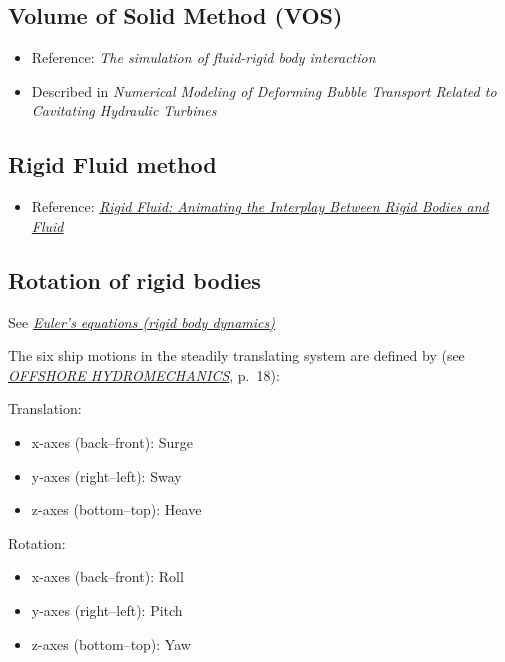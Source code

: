 \subsection{Volume of Solid Method (VOS)}

\begin{itemize}
    \item Reference: \textit{The simulation of fluid-rigid body interaction}
    \item Described in \textit{Numerical Modeling of Deforming Bubble Transport Related to Cavitating Hydraulic Turbines}
\end{itemize}

\subsection{Rigid Fluid method}

\begin{itemize}
    \item Reference: \textit{\href{http://www.amath.unc.edu/Faculty/mucha/Reprints/siggraph04.pdf}{Rigid Fluid: Animating the Interplay Between Rigid Bodies and Fluid}}
\end{itemize}

\subsection{Rotation of rigid bodies}

See \textit{\href{http://en.wikipedia.org/wiki/Euler\%27s_equations_\%28rigid_body_dynamics\%29}{Euler's equations (rigid body dynamics)}}

The six ship motions in the steadily translating system are defined by (see \textit{\href{http://www.shipmotions.nl/DUT/LectureNotes/OffshoreHydromechanics.pdf}{OFFSHORE HYDROMECHANICS}}, p.~18):

Translation:

\begin{itemize}
    \item x-axes (back--front): Surge
    \item y-axes (right--left): Sway
    \item z-axes (bottom--top): Heave
\end{itemize}

Rotation:

\begin{itemize}
    \item x-axes (back--front): Roll
    \item y-axes (right--left): Pitch
    \item z-axes (bottom--top): Yaw
\end{itemize}

